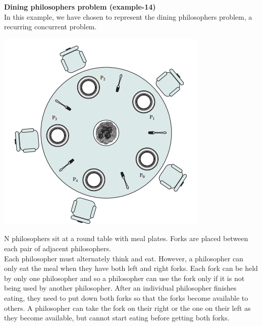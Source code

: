 \documentclass[11pt]{report}
\begin{document}
\tabto{0cm} {\Large \textbf{Dining philosophers problem (example-14)}}
\vspace*{3pt}
\\
In this example, we have chosen to represent the dining philosophers problem, a recurring concurrent problem.
\begin{center}
\includegraphics[scale = 0.5]{Dining.png}
\end{center}

N philosophers sit at a round table with meal plates. Forks are placed between each pair of adjacent philosophers.
\\ Each philosopher must alternately think and eat. However, a philosopher can only eat the meal when they have both left and right forks. Each fork can be held by only one philosopher and so a philosopher can use the fork only if it is not being used by another philosopher. After an individual philosopher finishes eating, they need to put down both forks so that the forks become available to others. A philosopher can take the fork on their right or the one on their left as they become available, but cannot start eating before getting both forks.
\end{document}
